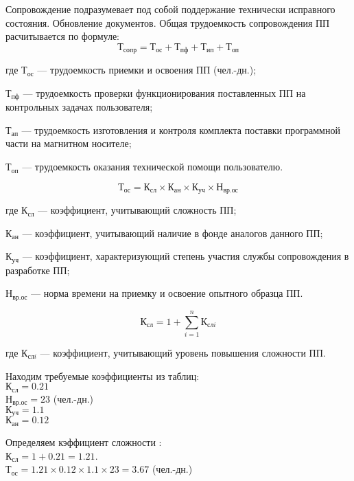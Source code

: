Сопровождение подразумевает под собой поддержание технически исправного состояния.
Обновление документов. Общая трудоемкость сопровождения ПП расчитывается по формуле:
\begin{equation}
	Т_{сопр} = Т_{ос} + Т_{пф} + Т_{ип} + Т_{оп}
\end{equation}
\begin{ESKDexplanation}
	\item[где ]{} $Т_{ос}$ --- трудоемкость приемки и освоения ПП (чел.-дн.);
	\item{} $Т_{пф}$ --- трудоемкость проверки функционирования поставленных ПП на контрольных задачах пользователя;
	\item{} $Т_{ап}$ --- трудоемкость изготовления и контроля комплекта поставки программной части на магнитном носителе;
	\item{} $Т_{оп}$ --- трудоемкость оказания технической помощи пользователю.
\end{ESKDexplanation}
\begin{equation}
Т_{ос} = К_{сл} \times К_{ан} \times К_{уч} \times Н_{вр.ос}
\end{equation}
\begin{ESKDexplanation}
	\item[где ]{} $К_{сл}$ --- коэффициент, учитывающий сложность ПП;
	\item{} $К_{ан}$ --- коэффициент, учитывающий наличие в фонде аналогов данного ПП;
	\item{} $К_{уч}$ --- коэффициент, характеризующий степень участия службы сопровождения в разработке ПП;
	\item{} $Н_{вр.ос}$ --- норма времени на приемку и освоение опытного образца ПП.
\end{ESKDexplanation}
\begin{equation}
	К_{сл} =1 + \sum_{i=1}^{n} К_{сл i}
\end{equation}
\begin{ESKDexplanation}
	\item[где ]{} $К_{сл i}$ --- коэффициент,  учитывающий уровень повышения сложности ПП.
\end{ESKDexplanation}
Находим требуемые коэффициенты из таблиц: \\
$К_{сл} = 0.21$ \\
$Н_{вр.ос} = 23$ (чел.-дн.) \\
$К_{уч} = 1.1$ \\
$К_{ан} = 0.12$


\begin{par}
Определяем кэффициент сложности : \\
$К_{сл} = 1 + 0.21 = 1.21$. \\
$Т_{ос} =  1.21 \times 0.12 \times 1.1 \times 23 = 3.67$ (чел.-дн.) 
\end{par}

